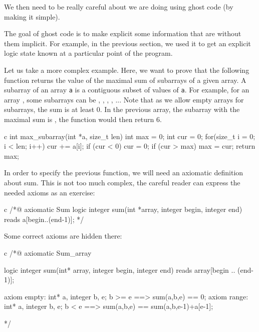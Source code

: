 We then need to be really careful about we are doing using ghost code
(by making it simple).





The goal of ghost code is to make explicit some information that are
without them implicit. For example, in the previous section, we used it
to get an explicit logic state known at a particular point of the
program.

Let us take a more complex example. Here, we want to prove that the
following function returns the value of the maximal sum of subarrays of
a given array. A subarray of an array \texttt{a} is a contiguous subset
of values of \texttt{a}. For example, for an array ,
some subarrays can be
\CodeInline{\{\}}, , 
, , ... Note that as we allow
empty arrays for subarrays, the sum is at least 0. In the previous
array, the subarray with the maximal sum is ,
the function would then return 6.



\begin{CodeBlock}{c}
int max_subarray(int *a, size_t len) {
  int max = 0;
  int cur = 0;
  for(size_t i = 0; i < len; i++) {
    cur += a[i];
    if (cur < 0)   cur = 0;
    if (cur > max) max = cur;
  }
  return max;
}
\end{CodeBlock}



In order to specify the previous function, we will need an axiomatic
definition about sum. This is not too much complex, the careful reader
can express the needed axioms as an exercise:



\begin{CodeBlock}{c}
/*@ axiomatic Sum {
  logic integer sum(int *array, integer begin, integer end) reads a[begin..(end-1)];
}*/
\end{CodeBlock}



Some correct axioms are hidden there:



\begin{Spoiler}
\begin{CodeBlock}{c}
/*@
  axiomatic Sum_array{
    logic integer sum(int* array, integer begin, integer end) reads array[begin .. (end-1)];
   
    axiom empty: 
      \forall int* a, integer b, e; b >= e ==> sum(a,b,e) == 0;
    axiom range:
      \forall int* a, integer b, e; b < e ==> sum(a,b,e) == sum(a,b,e-1)+a[e-1];
  }
*/
\end{CodeBlock}
\end{Spoiler}


